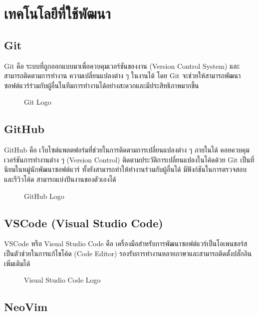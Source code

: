 \newpage

\section{เทคโนโลยีที่ใช้พัฒนา}

\subsection{Git}

Git คือ ระบบที่ถูกออกแบบมาเพื่อควบคุมเวอร์ชันของงาน (Version Control System) และสามารถติดตามการทำงาน ความเปลี่ยนแปลงต่าง ๆ ในงานได้ โดย Git จะช่วยให้สามารถพัฒนาซอฟต์แวร์ร่วมกับผู้อื่นในทีมการทำงานได้อย่างสะดวกและมีประสิทธิภาพมากขึ้น \cite{BasicGit}

\begin{figure}[H]
    \centering
    \caption{Git Logo}
    \label{fig:git}
\end{figure}

\subsection{GitHub}

GitHub คือ เว็บไซต์แพลตฟอร์มที่ช่วยในการติดตามการเปลี่ยนแปลงต่าง ๆ ภายในได้ คอยควบคุมเวอร์ชันการทำงานต่าง ๆ (Version Control) ติดตามประวัติการเปลี่ยนแปลงในโค้ดด้วย Git เป็นที่นิยมในหมู่นักพัฒนาซอฟต์แวร์ ทั้งยังสามารถทำให้ทำงานร่วมกับผู้อื่นได้ มีฟังก์ชันในการตรวจสอบและรีวิวโค้ด สามารถแบ่งปันงานของตัวเองได้ \cite{VCSGitHub}

\begin{figure}[H]
    \centering
    \caption{GitHub Logo}
    \label{fig:github}
\end{figure}

\subsection{VSCode (Visual Studio Code)}

VSCode หรือ Visual Studio Code คือ เครื่องมือสำหรับการพัฒนาซอฟต์แวร์เป็นโอเพนชอร์สเป็นตัวช่วยในการแก้ไขโค้ด (Code Editor) รองรับการทำงานหลายภาษาและสามารถติดตั้งปลั๊กอินเพิ่มเติมได้ \cite{KnowVSCode}

\begin{figure}[H]
    \centering
    \caption{Visual Studio Code Logo}
    \label{fig:vscode}
\end{figure}

\subsection{NeoVim}

